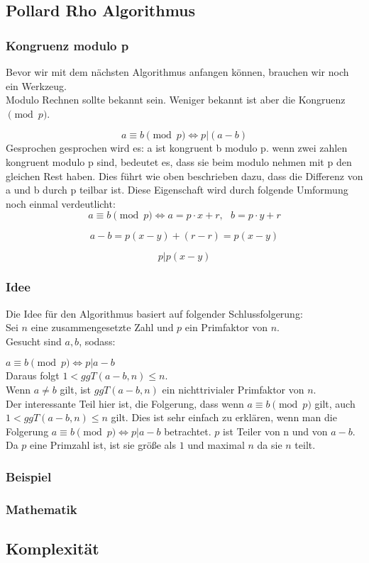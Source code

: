 	
 	\subsection{Pollard Rho Algorithmus}
 	\subsubsection{Kongruenz modulo p}
 		Bevor wir mit dem n\"achsten Algorithmus anfangen können, brauchen wir noch ein Werkzeug.\\
	 	Modulo Rechnen sollte bekannt sein. Weniger bekannt ist aber die Kongruenz $\pmod p$.
 	 
		\[a \equiv b \pmod p \Leftrightarrow p|(a-b)\]
		Gesprochen gesprochen wird es: a ist kongruent b modulo p. wenn zwei zahlen kongruent modulo p sind, bedeutet es, dass sie beim modulo nehmen mit p den gleichen Rest haben. Dies f\"uhrt wie oben beschrieben dazu, dass die Differenz von a und b durch p teilbar ist. Diese Eigenschaft wird durch folgende Umformung noch einmal 	verdeutlicht:
		\[a \equiv b \pmod p \Leftrightarrow a=p\cdot x +r,\ \ \ b= p\cdot y +r\]

		\[a-b=p(x-y)+(r-r)=p(x-y)\]

		\[p|p(x-y)\]

 	\subsubsection{Idee}
 	
 	  	Die Idee f\"ur den Algorithmus basiert auf folgender Schlussfolgerung: \\
 	  	Sei $n$ eine zusammengesetzte Zahl und $p$ ein Primfaktor von $n$.\\
 		Gesucht sind $a, b$, sodass:

  		$a \equiv b \pmod p \Leftrightarrow p|a-b$ \\
 		Daraus folgt $1<ggT(a-b,n) \leq  n$. \\Wenn $a\not = b$ gilt, ist $ggT(a-b,n)$ ein nichttrivialer Primfaktor von $n$.\\
 		\newline
		Der interessante Teil hier ist, die Folgerung, dass wenn $a \equiv b \pmod p$ gilt, auch $1<ggT(a-b,n) \leq  n$ gilt. Dies ist sehr einfach zu erkl\"aren, wenn man die Folgerung $a \equiv b \pmod p \Leftrightarrow p|a-b$ betrachtet. $p$ ist Teiler von n und von $a-b$. Da $p$ eine Primzahl ist, ist sie gr\"o\ss e als $1$ und maximal $n$ da sie $n$ teilt.
  
  
 	\subsubsection{Beispiel}
 	\subsubsection{Mathematik}
 	\label{sec:pollardBeweis}
 	\subsection{Komplexit\"at}	